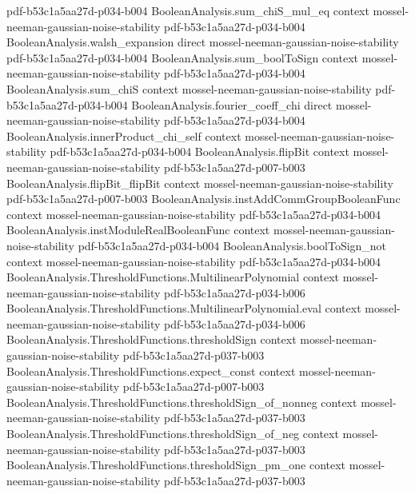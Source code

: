 \begin{theorem}
  {pdf-b53c1a5aa27d-p034-b004}
\proofstep
  {BooleanAnalysis.sum_chiS_mul_eq}
  {context}
  {mossel-neeman-gaussian-noise-stability}
  {pdf-b53c1a5aa27d-p034-b004}
\proofstep
  {BooleanAnalysis.walsh_expansion}
  {direct}
  {mossel-neeman-gaussian-noise-stability}
  {pdf-b53c1a5aa27d-p034-b004}
\proofstep
  {BooleanAnalysis.sum_boolToSign}
  {context}
  {mossel-neeman-gaussian-noise-stability}
  {pdf-b53c1a5aa27d-p034-b004}
\proofstep
  {BooleanAnalysis.sum_chiS}
  {context}
  {mossel-neeman-gaussian-noise-stability}
  {pdf-b53c1a5aa27d-p034-b004}
\proofstep
  {BooleanAnalysis.fourier_coeff_chi}
  {direct}
  {mossel-neeman-gaussian-noise-stability}
  {pdf-b53c1a5aa27d-p034-b004}
\proofstep
  {BooleanAnalysis.innerProduct_chi_self}
  {context}
  {mossel-neeman-gaussian-noise-stability}
  {pdf-b53c1a5aa27d-p034-b004}
\proofstep
  {BooleanAnalysis.flipBit}
  {context}
  {mossel-neeman-gaussian-noise-stability}
  {pdf-b53c1a5aa27d-p007-b003}
\proofstep
  {BooleanAnalysis.flipBit_flipBit}
  {context}
  {mossel-neeman-gaussian-noise-stability}
  {pdf-b53c1a5aa27d-p007-b003}
\proofstep
  {BooleanAnalysis.instAddCommGroupBooleanFunc}
  {context}
  {mossel-neeman-gaussian-noise-stability}
  {pdf-b53c1a5aa27d-p034-b004}
\proofstep
  {BooleanAnalysis.instModuleRealBooleanFunc}
  {context}
  {mossel-neeman-gaussian-noise-stability}
  {pdf-b53c1a5aa27d-p034-b004}
\proofstep
  {BooleanAnalysis.boolToSign_not}
  {context}
  {mossel-neeman-gaussian-noise-stability}
  {pdf-b53c1a5aa27d-p034-b004}
\proofstep
  {BooleanAnalysis.ThresholdFunctions.MultilinearPolynomial}
  {context}
  {mossel-neeman-gaussian-noise-stability}
  {pdf-b53c1a5aa27d-p034-b006}
\proofstep
  {BooleanAnalysis.ThresholdFunctions.MultilinearPolynomial.eval}
  {context}
  {mossel-neeman-gaussian-noise-stability}
  {pdf-b53c1a5aa27d-p034-b006}
\proofstep
  {BooleanAnalysis.ThresholdFunctions.thresholdSign}
  {context}
  {mossel-neeman-gaussian-noise-stability}
  {pdf-b53c1a5aa27d-p037-b003}
\proofstep
  {BooleanAnalysis.ThresholdFunctions.expect_const}
  {context}
  {mossel-neeman-gaussian-noise-stability}
  {pdf-b53c1a5aa27d-p007-b003}
\proofstep
  {BooleanAnalysis.ThresholdFunctions.thresholdSign_of_nonneg}
  {context}
  {mossel-neeman-gaussian-noise-stability}
  {pdf-b53c1a5aa27d-p037-b003}
\proofstep
  {BooleanAnalysis.ThresholdFunctions.thresholdSign_of_neg}
  {context}
  {mossel-neeman-gaussian-noise-stability}
  {pdf-b53c1a5aa27d-p037-b003}
\proofstep
  {BooleanAnalysis.ThresholdFunctions.thresholdSign_pm_one}
  {context}
  {mossel-neeman-gaussian-noise-stability}
  {pdf-b53c1a5aa27d-p037-b003}
\proofstep

\end{theorem}

